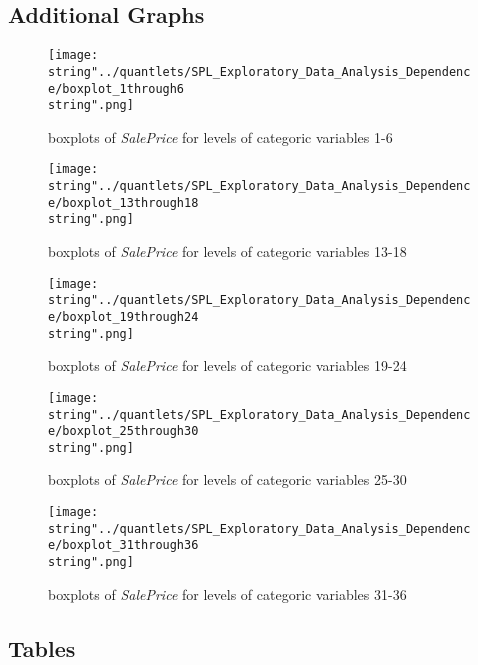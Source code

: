 \subsection{Additional Graphs}

\begin{figure}[H]
\centering
\texttt{[image: \\string"../quantlets/SPL\_Exploratory\_Data\_Analysis\_Dependence/boxplot\_1through6\\string".png]}
\caption{boxplots of \textit{SalePrice} for levels of categoric variables 1-6}
\label{fig:box1to6}
\end{figure}

\begin{figure}[H]
\centering
\texttt{[image: \\string"../quantlets/SPL\_Exploratory\_Data\_Analysis\_Dependence/boxplot\_13through18\\string".png]}
\caption{boxplots of \textit{SalePrice} for levels of categoric variables 13-18}
\label{fig:box13to18}
\end{figure}

\begin{figure}[H]
\centering
\texttt{[image: \\string"../quantlets/SPL\_Exploratory\_Data\_Analysis\_Dependence/boxplot\_19through24\\string".png]}
\caption{boxplots of \textit{SalePrice} for levels of categoric variables 19-24}
\label{fig:box19to24}
\end{figure}

\begin{figure}[H]
\centering
\texttt{[image: \\string"../quantlets/SPL\_Exploratory\_Data\_Analysis\_Dependence/boxplot\_25through30\\string".png]}
\caption{boxplots of \textit{SalePrice} for levels of categoric variables 25-30}
\label{fig:box25to30}
\end{figure}

\begin{figure}[H]
\centering
\texttt{[image: \\string"../quantlets/SPL\_Exploratory\_Data\_Analysis\_Dependence/boxplot\_31through36\\string".png]}
\caption{boxplots of \textit{SalePrice} for levels of categoric variables 31-36}
\label{fig:box31to36}
\end{figure}

\subsection{Tables}




